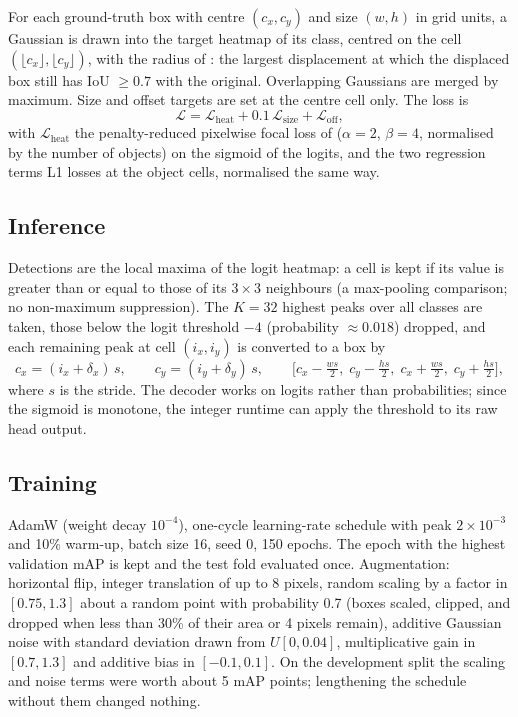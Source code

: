 \documentclass[11pt,a4paper]{article}
\begin{document}
For each ground-truth box with centre $(c_x, c_y)$ and size $(w, h)$ in grid
units, a Gaussian is drawn into the target heatmap of its class, centred on
the cell $(\lfloor c_x \rfloor, \lfloor c_y \rfloor)$, with the radius of
\cite{law2018}: the largest displacement at which the displaced box still
has IoU $\ge 0.7$ with the original. Overlapping Gaussians are merged by
maximum. Size and offset targets are set at the centre cell only. The loss is
\begin{equation}
  \mathcal{L} = \mathcal{L}_\text{heat} + 0.1\,\mathcal{L}_\text{size} + \mathcal{L}_\text{off},
\end{equation}
with $\mathcal{L}_\text{heat}$ the penalty-reduced pixelwise focal loss of
\cite{zhou2019} ($\alpha = 2$, $\beta = 4$, normalised by the number of
objects) on the sigmoid of the logits, and the two regression terms L1 losses
at the object cells, normalised the same way.

\subsection{Inference}

Detections are the local maxima of the logit heatmap: a cell is kept if its
value is greater than or equal to those of its $3 \times 3$ neighbours (a
max-pooling comparison; no non-maximum suppression). The $K = 32$ highest
peaks over all classes are taken, those below the logit threshold $-4$
(probability $\approx 0.018$) dropped, and each remaining peak at cell
$(i_x, i_y)$ is converted to a box by
\begin{equation}
  c_x = (i_x + \delta_x)\,s, \qquad c_y = (i_y + \delta_y)\,s, \qquad
  \bigl[c_x - \tfrac{w s}{2},\; c_y - \tfrac{h s}{2},\; c_x + \tfrac{w s}{2},\; c_y + \tfrac{h s}{2}\bigr],
\end{equation}
where $s$ is the stride. The decoder works on logits rather than
probabilities; since the sigmoid is monotone, the integer runtime can apply
the threshold to its raw head output.

\subsection{Training}

AdamW (weight decay $10^{-4}$), one-cycle learning-rate schedule with peak
$2 \times 10^{-3}$ and 10\% warm-up, batch size 16, seed 0, 150 epochs. The
epoch with the highest validation mAP is kept and the test fold evaluated
once. Augmentation: horizontal flip, integer translation of up to 8 pixels,
random scaling by a factor in $[0.75, 1.3]$ about a random point with
probability 0.7 (boxes scaled, clipped, and dropped when less than 30\% of
their area or 4 pixels remain), additive Gaussian noise with standard
deviation drawn from $U[0, 0.04]$, multiplicative gain in $[0.7, 1.3]$ and
additive bias in $[-0.1, 0.1]$. On the development split the scaling and
noise terms were worth about 5 mAP points; lengthening the schedule without
them changed nothing.
\end{document}
